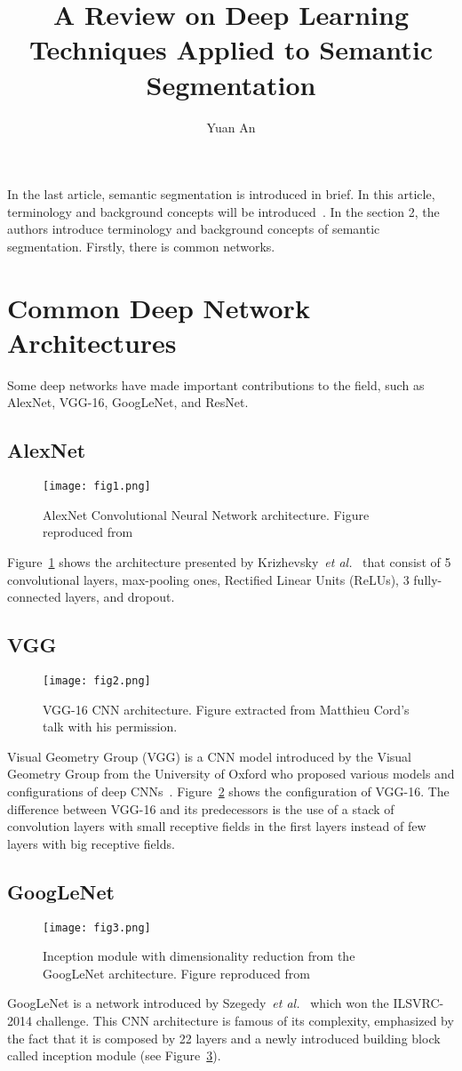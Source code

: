 \documentclass[10pt,twocolumn,letterpaper]{article}
\begin{document}
	\title{A Review on Deep Learning Techniques Applied to Semantic Segmentation}	
	\author{Yuan An}
	\maketitle
	In the last article, semantic segmentation is introduced in brief. In this article, terminology and background concepts will be introduced~\cite{citedarticle}. In the section 2, the authors introduce terminology and background concepts of semantic segmentation. Firstly, there is common networks.
	\section*{Common Deep Network Architectures}
	Some deep networks have made important contributions to the field, such as AlexNet, VGG-16, GoogLeNet, and ResNet.
	\subsection*{AlexNet}
	\begin{figure}[h]
		\centering
		\texttt{[image: fig1.png]}
		\caption{AlexNet Convolutional Neural Network architecture. Figure reproduced from~\cite{Krizhevsky2012ImageNet}} \label{fig1}
	\end{figure}
	Figure~\ref{fig1} shows the architecture presented by Krizhevsky~\emph{et al.}~\cite{Krizhevsky2012ImageNet} that consist of 5 convolutional layers, max-pooling ones, Rectified Linear Units (ReLUs), 3 fully-connected layers, and dropout.
	\subsection*{VGG}
	\begin{figure}[h]
		\centering
		\texttt{[image: fig2.png]}
		\caption{VGG-16 CNN architecture. Figure extracted from Matthieu Cord's talk with his permission.} \label{fig2}
	\end{figure}
	Visual Geometry Group (VGG) is a CNN model introduced by the Visual Geometry Group from the University of Oxford who proposed various models and configurations of deep CNNs~\cite{Simonyan}. Figure~\ref{fig2} shows the configuration of VGG-16. The difference between VGG-16 and its predecessors is the use of a stack of convolution layers with small receptive fields in the first layers instead of few layers with big receptive fields.
	\subsection*{GoogLeNet}
	\begin{figure}[h]
		\centering
		\texttt{[image: fig3.png]}
		\caption{Inception module with dimensionality reduction from the GoogLeNet architecture. Figure reproduced from~\cite{Szegedy}} \label{fig3}
	\end{figure}
	GoogLeNet is a network introduced by Szegedy~\emph{et al.}~\cite{Szegedy} which won the ILSVRC-2014 challenge. This CNN architecture is famous of its complexity, emphasized by the fact that it is composed by 22 layers and a newly introduced building block called inception module (see Figure~\ref{fig3}).
\end{document}

